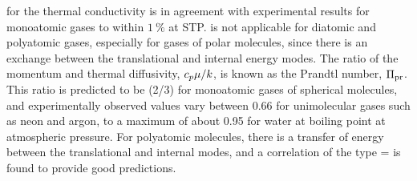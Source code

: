  for the thermal conductivity is in agreement with experimental results for monoatomic gases to within $\SI{1}{\%}$ at STP.  is not applicable for diatomic and polyatomic gases, especially for gases of polar molecules, since there is an exchange between the translational and internal energy modes. The ratio of the momentum and thermal diffusivity, $c_p\mu/k$, is known as the Prandtl number, $\Pi_\text{pr}$. This ratio is predicted to be (2/3) for monoatomic gases of spherical molecules, and experimentally observed values vary between 0.66 for unimolecular gases such as neon and argon, to a maximum of about 0.95 for water at boiling point at atmospheric pressure. For polyatomic molecules, there is a transfer of energy between the translational and internal modes, and a correlation of the type 
\beq
\kprandtl = \dfrac{\kshcap_\press}{\kshcap_\press + 1.25\kgas}
\eeq
is found to provide good predictions.
